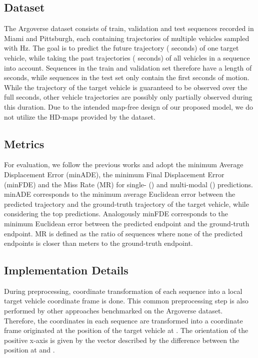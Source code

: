 \documentclass[letterpaper, 10 pt, conference]{ieeeconf}
\begin{document}
\subsection{Dataset}
The Argoverse dataset consists of  train,  validation and  test sequences recorded in Miami and Pittsburgh, each containing trajectories of multiple vehicles sampled with \unit[]{Hz}.
The goal is to predict the future trajectory ( seconds) of one target vehicle, while taking the past trajectories ( seconds) of all vehicles in a sequence into account.
Sequences in the train and validation set therefore have a length of  seconds, while sequences in the test set only contain the first  seconds of motion.
While the trajectory of the target vehicle is guaranteed to be observed over the full  seconds, other vehicle trajectories are possibly only partially observed during this duration.
Due to the intended map-free design of our proposed model, we do not utilize the HD-maps provided by the dataset.

\subsection{Metrics}
For evaluation, we follow the previous works and adopt the minimum Average Displacement Error (minADE), the minimum Final Displacement Error (minFDE) and the Miss Rate (MR) for single- () and multi-modal () predictions.
minADE corresponds to the minimum average Euclidean error between the predicted trajectory and the ground-truth trajectory of the target vehicle, while considering the top  predictions.
Analogously minFDE corresponds to the minimum Euclidean error between the predicted endpoint and the ground-truth endpoint.
MR is defined as the ratio of sequences where none of the predicted endpoints is closer than  meters to the ground-truth endpoint.

\subsection{Implementation Details}
During preprocessing, coordinate transformation of each sequence into a local target vehicle coordinate frame is done.
This common preprocessing step is also performed by other approaches \cite{Liang2020, Ye2021} benchmarked on the Argoverse dataset.
Therefore, the coordinates in each sequence are transformed into a coordinate frame originated at the position of the target vehicle at .
The orientation of the positive x-axis is given by the vector described by the difference between the position at  and .
\end{document}
